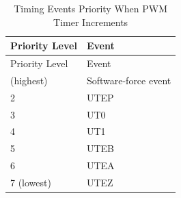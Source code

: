 \begin{longtable}[c]{|p{6cm}|p{6cm}|}
    \caption{Timing Events Priority When PWM Timer Increments}
    \label{table:evt_prio_u}
    \\\hline
    \rowcolor{lightgray}
    Priority Level
    & Event
    \\\hline
    \endfirsthead
    \hline
    \rowcolor{lightgray}   
    Priority Level
    & Event
    \\\hline
    \endhead
    \hline
    \endfoot
    1 (highest)
    & Software-force event
    \\\hline
    2
    & UTEP
    \\\hline
    3
    & UT0
    \\\hline
    4
    & UT1
    \\\hline
    5
    & UTEB
    \\\hline
    6
    & UTEA
    \\\hline
    7 (lowest)
    & UTEZ  
\end{longtable}